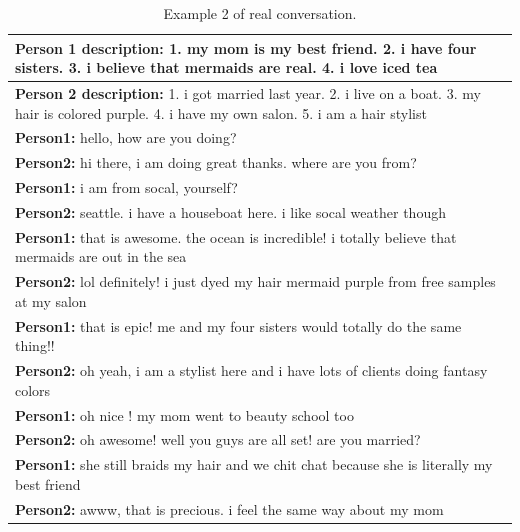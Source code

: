 \begin{table}[ht]
\centering
 \begin{tabular}{|p{14cm}|} 
 \hline\hline
 \textbf{Person 1 description:} 1. my mom is my best friend. 2. i have four sisters. 3. i believe that mermaids are real. 4. i love iced tea \\
 \hline
 \textbf{Person 2 description:} 1. i got married last year. 2. i live on a boat. 3. my hair is colored purple. 4. i have my own salon. 5. i am a hair stylist \\
 \hline\hline
 \textbf{Person1:} hello, how are you doing? \\
 \textbf{Person2:} hi there, i am doing great thanks. where are you from?\\ 
 \textbf{Person1:} i am from socal, yourself? \\
 \textbf{Person2:} seattle. i have a houseboat here. i like socal weather though\\
 \textbf{Person1:} that is awesome. the ocean is incredible! i totally believe that mermaids are out in the sea \\
 \textbf{Person2:} lol definitely! i just dyed my hair mermaid purple from free samples at my salon \\
 \textbf{Person1:} that is epic! me and my four sisters would totally do the same thing!! \\
 \textbf{Person2:} oh yeah, i am a stylist here and i have lots of clients doing fantasy colors \\
 \textbf{Person1:} oh nice ! my mom went to beauty school too \\
 \textbf{Person2:} oh awesome! well you guys are all set! are you married? \\
 \textbf{Person1:} she still braids my hair and we chit chat because she is literally my best friend \\
 \textbf{Person2:} awww, that is precious. i feel the same way about my mom \\
 \hline\hline
 \end{tabular}
 \caption{Example 2 of real conversation.}
\label{tab:real_conversation_2}
\end{table}

